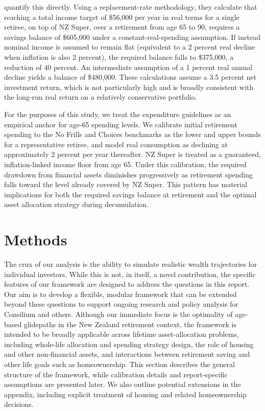 \documentclass[11pt]{article}
\begin{document}
\textcite{riig2024spending} quantify this directly. Using a replacement-rate methodology, they calculate that reaching a total income target of \$56,000 per year in real terms for a single retiree, on top of NZ Super, over a retirement from age 65 to 90, requires a savings balance of \$605,000 under a constant-real-spending assumption. If instead nominal income is assumed to remain flat (equivalent to a 2 percent real decline when inflation is also 2 percent), the required balance falls to \$375,000, a reduction of 40 percent. An intermediate assumption of a 1 percent real annual decline yields a balance of \$480,000. These calculations assume a 3.5 percent net investment return, which is not particularly high and is broadly consistent with the long-run real return on a relatively conservative portfolio.

For the purposes of this study, we treat the expenditure guidelines as an empirical anchor for age-65 spending levels. We calibrate initial retirement spending to the No Frills and Choices benchmarks as the lower and upper bounds for a representative retiree, and model real consumption as declining at approximately 2 percent per year thereafter. NZ Super is treated as a guaranteed, inflation-linked income floor from age 65. Under this calibration, the required drawdown from financial assets diminishes progressively as retirement spending falls toward the level already covered by NZ Super. This pattern has material implications for both the required savings balance at retirement and the optimal asset allocation strategy during decumulation.

\section{Methods}

The crux of our analysis is the ability to simulate realistic wealth trajectories for individual investors. While this is not, in itself, a novel contribution, the specific features of our framework are designed to address the questions in this report. Our aim is to develop a flexible, modular framework that can be extended beyond these questions to support ongoing research and policy analysis for Consilium and others. Although our immediate focus is the optimality of age-based glidepaths in the New Zealand retirement context, the framework is intended to be broadly applicable across lifetime asset-allocation problems, including whole-life allocation and spending strategy design, the role of housing and other non-financial assets, and interactions between retirement saving and other life goals such as homeownership. This section describes the general structure of the framework, while calibration details and report-specific assumptions are presented later. We also outline potential extensions in the appendix, including explicit treatment of housing and related homeownership decisions.
\end{document}
